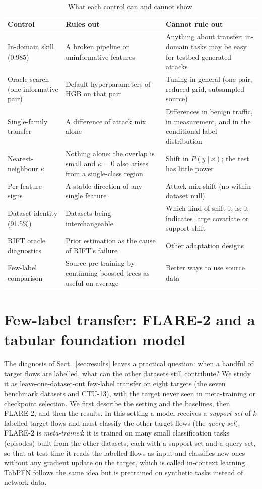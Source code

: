 \documentclass[11pt]{article}
\begin{document}
\begin{table}[t]
\centering\small
\caption{What each control can and cannot show.}\label{tab:controls}
\begin{tabular}{p{}p{}p{}}
\toprule
Control & Rules out & Cannot rule out \\
\midrule
In-domain skill (0.985) & A broken pipeline or uninformative features & Anything about transfer; in-domain tasks may be easy for testbed-generated attacks \\
Oracle search (one informative pair) & Default hyperparameters of HGB on that pair & Tuning in general (one pair, reduced grid, subsampled source) \\
Single-family transfer & A difference of attack mix alone & Differences in benign traffic, in measurement, and in the conditional label distribution \\
Nearest-neighbour $\kappa$ & Nothing alone: the overlap is small and $\kappa=0$ also arises from a single-class region & Shift in $P(y\mid x)$; the test has little power \\
Per-feature signs & A stable direction of any single feature & Attack-mix shift (no within-dataset null) \\
Dataset identity (91.5\%) & Datasets being interchangeable & Which kind of shift it is; it indicates large covariate or support shift \\
RIFT oracle diagnostics & Prior estimation as the cause of RIFT's failure & Other adaptation designs \\
Few-label comparison & Source pre-training by continuing boosted trees as useful on average & Better ways to use source data \\
\bottomrule
\end{tabular}
\end{table}

\section{Few-label transfer: FLARE-2 and a tabular foundation model}\label{sec:fewlabel}
The diagnosis of Sect.~\ref{sec:results} leaves a practical question: when a handful of target flows are labelled, what can the other datasets still contribute?
We study it as leave-one-dataset-out few-label transfer on eight targets (the seven benchmark datasets and CTU-13), with the target never seen in meta-training or checkpoint selection.
We first describe the setting and the baselines, then FLARE-2, and then the results.
In this setting a model receives a \emph{support set} of $k$ labelled target flows and must classify the other target flows (the \emph{query set}).
FLARE-2 is \emph{meta-trained}: it is trained on many small classification tasks (episodes) built from the other datasets, each with a support set and a query set, so that at test time it reads the labelled flows as input and classifies new ones without any gradient update on the target, which is called in-context learning.
TabPFN follows the same idea but is pretrained on synthetic tasks instead of network data.
\end{document}
